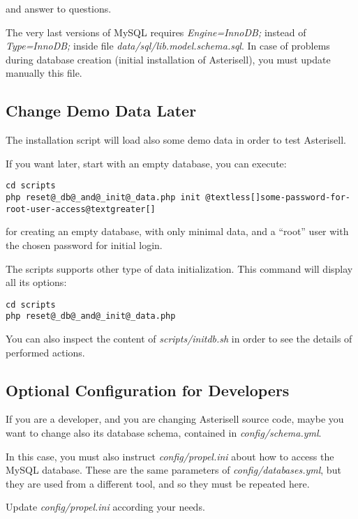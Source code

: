 \documentclass[letterpaper,10pt,english]{sphinxmanual}
\begin{document}
and answer to questions.

The very last versions of MySQL requires \emph{Engine=InnoDB;} instead of \emph{Type=InnoDB;} inside file \emph{data/sql/lib.model.schema.sql}. In case of problems during database creation (initial installation of Asterisell), you must update manually this file.


\subsection{Change Demo Data Later}
\label{index:change-demo-data-later}
The installation script will load also some demo data in order to test Asterisell.

If you want later, start with an empty database, you can execute:

\begin{Verbatim}[commandchars=@\[\]]
cd scripts
php reset@_db@_and@_init@_data.php init @textless[]some-password-for-root-user-access@textgreater[]
\end{Verbatim}

for creating an empty database, with only minimal data, and a ``root'' user with the chosen password for initial login.

The scripts supports other type of data initialization. This command will display all its options:

\begin{Verbatim}[commandchars=@\[\]]
cd scripts
php reset@_db@_and@_init@_data.php
\end{Verbatim}

You can also inspect the content of \emph{scripts/initdb.sh} in order to see the details of performed actions.


\subsection{Optional Configuration for Developers}
\label{index:optional-configuration-for-developers}
If you are a developer, and you are changing Asterisell source code, maybe you want to change also its database schema, contained in \emph{config/schema.yml}.

In this case, you must also instruct \emph{config/propel.ini} about how to access the MySQL database. These are the same parameters of \emph{config/databases.yml}, but they are used from a different tool, and so they must be repeated here.

Update \emph{config/propel.ini} according your needs.
\end{document}
